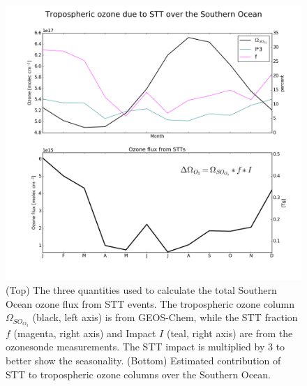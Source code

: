   \begin{figure}[t]
    \includegraphics[width=12.0cm]{figures/SO_extrapolation.png}
    \caption{%
      (Top) The three quantities used to calculate the total Southern Ocean ozone flux from STT events.
      The tropospheric ozone column $\Omega_{SO_{O_3}}$ (black, left axis) is from GEOS-Chem, while the STT fraction $f$ (magenta, right axis) and Impact $I$ (teal, right axis) are from the ozonesonde measurements.
      The STT impact is multiplied by 3 to better show the seasonality.
      (Bottom) Estimated contribution of STT to tropospheric ozone columns over the Southern Ocean.}
    \label{fig:SOExtrapolation}
  \end{figure}


